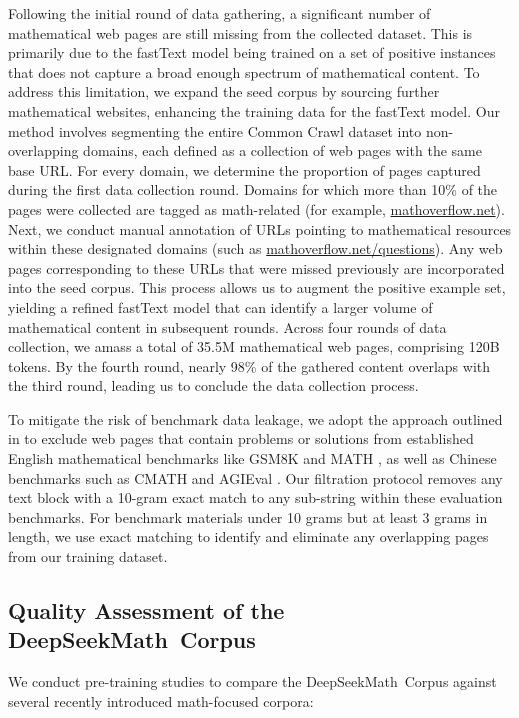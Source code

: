 \begin{itemize}[topsep=0pt]
Following the initial round of data gathering, a significant number of mathematical web pages are still missing from the collected dataset. This is primarily due to the fastText model being trained on a set of positive instances that does not capture a broad enough spectrum of mathematical content. To address this limitation, we expand the seed corpus by sourcing further mathematical websites, enhancing the training data for the fastText model. Our method involves segmenting the entire Common Crawl dataset into non-overlapping domains, each defined as a collection of web pages with the same base URL. For every domain, we determine the proportion of pages captured during the first data collection round. Domains for which more than 10\% of the pages were collected are tagged as math-related (for example, \url{mathoverflow.net}). Next, we conduct manual annotation of URLs pointing to mathematical resources within these designated domains (such as \url{mathoverflow.net/questions}). Any web pages corresponding to these URLs that were missed previously are incorporated into the seed corpus. This process allows us to augment the positive example set, yielding a refined fastText model that can identify a larger volume of mathematical content in subsequent rounds. Across four rounds of data collection, we amass a total of 35.5M mathematical web pages, comprising 120B tokens. By the fourth round, nearly 98\% of the gathered content overlaps with the third round, leading us to conclude the data collection process.

To mitigate the risk of benchmark data leakage, we adopt the approach outlined in \cite{deepseek-coder} to exclude web pages that contain problems or solutions from established English mathematical benchmarks like GSM8K \citep{gsm8k} and MATH \citep{MATH}, as well as Chinese benchmarks such as CMATH \citep{wei2023cmath} and AGIEval \citep{agieval}. Our filtration protocol removes any text block with a 10-gram exact match to any sub-string within these evaluation benchmarks. For benchmark materials under 10 grams but at least 3 grams in length, we use exact matching to identify and eliminate any overlapping pages from our training dataset.

\subsection{Quality Assessment of the DeepSeekMath~Corpus}

We conduct pre-training studies to compare the DeepSeekMath~Corpus against several recently introduced math-focused corpora:


\end{itemize}
